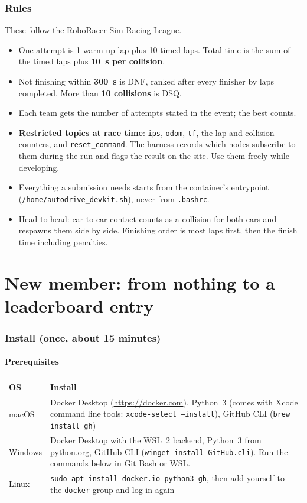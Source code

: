 \documentclass[11pt,a4paper]{article}
\newcommand{\file}[1]{\texttt{#1}}
\newcommand{\cmd}[1]{\texttt{#1}}
\newcommand{\rulebox}[1]{\par\noindent\colorbox{codebg}{\parbox{\dimexpr\linewidth-2\fboxsep}{#1}}\par\medskip}
\begin{document}
\section{Rules}

These follow the RoboRacer Sim Racing League.

\rulebox{
\begin{itemize}
  \item One attempt is 1 warm-up lap plus 10 timed laps. Total time is the sum of the timed laps plus \textbf{10~s per collision}.
  \item Not finishing within \textbf{300~s} is DNF, ranked after every finisher by laps completed. More than \textbf{10 collisions} is DSQ.
  \item Each team gets the number of attempts stated in the event; the best counts.
  \item \textbf{Restricted topics at race time}: \texttt{ips}, \texttt{odom}, \texttt{tf}, the lap and collision counters, and \texttt{reset\_command}. The harness records which nodes subscribe to them during the run and flags the result on the site. Use them freely while developing.
  \item Everything a submission needs starts from the container's entrypoint (\file{/home/autodrive\_devkit.sh}), never from \file{.bashrc}.
  \item Head-to-head: car-to-car contact counts as a collision for both cars and respawns them side by side. Finishing order is most laps first, then the finish time including penalties.
\end{itemize}}

\part{New member: from nothing to a leaderboard entry}

\section{Install (once, about 15 minutes)}

\subsection{Prerequisites}

\begin{tabularx}{\linewidth}{lX}
\toprule
OS & Install\\
\midrule
macOS & Docker Desktop (\url{https://docker.com}), Python~3 (comes with Xcode command line tools: \cmd{xcode-select --install}), GitHub CLI (\cmd{brew install gh})\\
Windows & Docker Desktop with the WSL~2 backend, Python~3 from python.org, GitHub CLI (\cmd{winget install GitHub.cli}). Run the commands below in Git Bash or WSL.\\
Linux & \cmd{sudo apt install docker.io python3 gh}, then add yourself to the \texttt{docker} group and log in again\\
\bottomrule
\end{tabularx}
\end{document}
